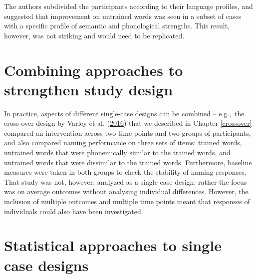 \documentclass{krantz}
\begin{document}
The authors subdivided the participants according to their language profiles, and suggested that improvement on untrained words was seen in a subset of cases with a specific profile of semantic and phonological strengths. This result, however, was not striking and would need to be replicated.

\hypertarget{combining-approaches-to-strengthen-study-design}{%
\section{Combining approaches to strengthen study design}\label{combining-approaches-to-strengthen-study-design}}

In practice, aspects of different single-case designs can be combined -- e.g.,~the cross-over design by Varley et al. (\protect\hyperlink{ref-varley2016}{2016}) that we described in Chapter \ref{crossover} compared an intervention across two time points and two groups of participants, and also compared naming performance on three sets of items: trained words, untrained words that were phonemically similar to the trained words, and untrained words that were dissimilar to the trained words. Furthermore, baseline measures were taken in both groups to check the stability of naming responses. That study was not, however, analyzed as a single case design: rather the focus was on average outcomes without analysing individual differences. However, the inclusion of multiple outcomes and multiple time points meant that responses of individuals could also have been investigated.

\hypertarget{statistical-approaches-to-single-case-designs}{%
\section{Statistical approaches to single case designs}\label{statistical-approaches-to-single-case-designs}}
\end{document}
